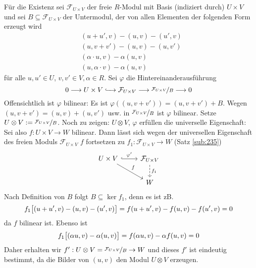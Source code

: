 Für die Existenz sei $\mathcal{F}_{U \times V}$ der freie $R$-Modul mit Basis (indiziert durch) $U \times V$ und sei $B \subseteq \mathcal{F}_{U \times V}$ der Untermodul,
der von allen Elementen der folgenden Form erzeugt wird
\begin{align*}
	&(u+u', v) - (u,v) - (u', v) \\
	&(u,v+v') - (u,v) - (u,v') \\
	&(\alpha \cdot u, v) - \alpha(u,v) \\
	&(u, \alpha \cdot v) - \alpha(u,v)
\end{align*}
für alle $u,u' \in U$, $v,v' \in V, \alpha \in R$. Sei $\varphi$ die Hintereinanderausführung
\[
	0 \longrightarrow U \times V \xhookrightarrow{\quad} \mathcal{F}_{U \times V} \longrightarrow \nicefrac{\mathcal{F}_{U \times V}}{B} \longrightarrow 0
\]
Offensichtlich ist $\varphi$ bilinear: Es ist $\varphi((u,v+ v')) = (u, v+ v')+ B $. Wegen $(u, v+v')= (u,v)+ (u, v')$ usw. in $\nicefrac{\mathcal{F}_{U\times V}}{B}$ ist
$\varphi$ bilinear. Setze $U \otimes V := \nicefrac{\mathcal{F}_{U \times V}}{B}$. Noch zu zeigen: $U \otimes V$, $\varphi$ erfüllen die universelle Eigenschaft:
Sei also $f : U \times V \to W$ bilinear. Dann lässt sich wegen der universellen Eigenschaft des freien Moduls $\mathcal{F}_{U \times V}$ $f$ fortsetzen zu 
$f_1 : \mathcal{F}_{U \times V} \to W$ (Satz \ref{sub:235})
\[
	\begin{tikzcd}
		U \times V \rar[hook]{\varphi'} \drar{f}& \mathcal{F}_{U \times V} \dar[dashed]{f_1}\\
		& W
	\end{tikzcd}
\]
Nach Definition von $B$ folgt $B \subseteq \ker f_1$, denn es ist zB.
\[
	f_1 \benbrace[\big]{(u+ u', v) - (u,v)- (u',v)} = f(u+u',v) - f(u,v) - f(u',v) = 0 
\]
da $f$ bilinear ist. Ebenso ist
\[
	f_1 \benbrace[\big]{(\alpha u, v) - \alpha(u,v)} = f(\alpha u,v) - \alpha f(u,v)  = 0 
\]
Daher erhalten wir $f' : U \otimes V = \nicefrac{\mathcal{F}_{U \times V}}{B} \to W$ und dieses $f'$ ist eindeutig bestimmt, da die Bilder von $(u,v)$ den Modul 
$U \otimes V$ erzeugen. \bewende

